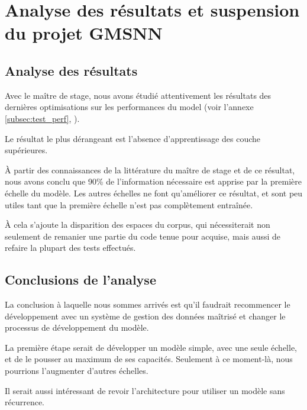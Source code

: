 \section{Analyse des résultats et suspension du projet GMSNN}\label{white_flag}



\subsection{Analyse des résultats}
Avec le maître de stage, nous avons étudié attentivement les résultats des dernières optimisations sur les performances du \gls{model} (voir l'annexe \ref{subsec:test_perf}, ). 

Le résultat le plus dérangeant est l'absence d'apprentissage des couche supérieures.

À partir des connaissances de la littérature du maître de stage et de ce résultat, nous avons conclu que 90\% de l'information nécessaire est apprise par la première échelle du modèle. Les autres échelles ne font qu'améliorer ce résultat, et sont peu utiles tant que la première échelle n'est pas complètement entraînée.

À cela s'ajoute la disparition des espaces du corpus, qui nécessiterait non seulement de remanier une partie du code tenue pour acquise, mais aussi de refaire la plupart des tests effectués.

\subsection{Conclusions de l'analyse}
La conclusion à laquelle nous sommes arrivés est qu'il faudrait recommencer le développement avec un système de gestion des données maîtrisé et changer le processus de développement du modèle.

La première étape serait de développer un modèle simple, avec une seule échelle, et de le pousser au maximum de ses capacités. Seulement à ce moment-là, nous pourrions l'augmenter d'autres échelles.

Il serait aussi intéressant de revoir l'architecture pour utiliser un modèle sans récurrence.

